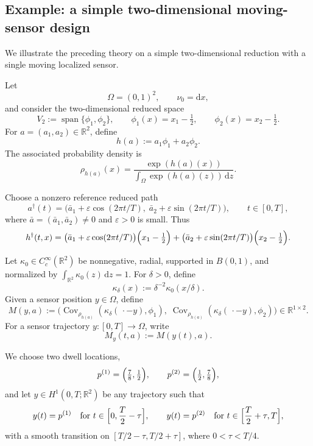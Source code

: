 \documentclass{article}
\theoremstyle{definition}
\renewcommand{\d}{\mathrm{d}}
\begin{document}
\subsection{Example: a simple two-dimensional moving-sensor design}
\label{subsec:2d-moving-sensor-example}

We illustrate the preceding theory on a simple two-dimensional reduction with a single moving
localized sensor.

Let
\[
    \Omega=(0,1)^2,
    \qquad
    \nu_0 = \d x,
\]
and consider the two-dimensional reduced space
\[
    V_2:=\operatorname{span}\{\phi_1,\phi_2\},
    \qquad
    \phi_1(x)=x_1-\tfrac12,
    \qquad
    \phi_2(x)=x_2-\tfrac12.
\]
For \(a=(a_1,a_2)\in\mathbb R^2\), define
\[
    h(a):=a_1\phi_1+a_2\phi_2.
\]
The associated probability density is
\[
    \rho_{h(a)}(x)
    =
    \frac{\exp(h(a)(x))}{\int_\Omega \exp(h(a)(z))\,\d z}.
\]

Choose a nonzero reference reduced path
\[
    a^\dagger(t)
    =
    \bigl(\bar a_1+\varepsilon \cos(2\pi t/T),\;
    \bar a_2+\varepsilon \sin(2\pi t/T)\bigr),
    \qquad t\in[0,T],
\]
where \(\bar a=(\bar a_1,\bar a_2)\neq 0\) and \(\varepsilon>0\) is small. Thus
\[
    h^\dagger(t,x)
    =
    \bigl(\bar a_1+\varepsilon \cos(2\pi t/T)\bigr)\Bigl(x_1-\tfrac12\Bigr)
    +
    \bigl(\bar a_2+\varepsilon \sin(2\pi t/T)\bigr)\Bigl(x_2-\tfrac12\Bigr).
\]

Let \(\kappa_0\in C_c^\infty(\mathbb R^2)\) be nonnegative, radial, supported in \(B(0,1)\), and
normalized by \(\int_{\mathbb R^2}\kappa_0(z)\,\d z=1\). For \(\delta>0\), define
\[
    \kappa_\delta(x):=\delta^{-2}\kappa_0(x/\delta).
\]
Given a sensor position \(y\in \Omega\), define
\[
    M(y,a)
    :=
    \bigl(
    \operatorname{Cov}_{\rho_{h(a)}}(\kappa_\delta(\,\cdot-y),\phi_1),\;
    \operatorname{Cov}_{\rho_{h(a)}}(\kappa_\delta(\,\cdot-y),\phi_2)
    \bigr)
    \in \mathbb R^{1\times 2}.
\]
For a sensor trajectory \(y:[0,T]\to\Omega\), write
\[
    M_y(t,a):=M(y(t),a).
\]

We choose two dwell locations,
\[
    p^{(1)}=\Bigl(\tfrac78,\tfrac12\Bigr),
    \qquad
    p^{(2)}=\Bigl(\tfrac12,\tfrac78\Bigr),
\]
and let \(y\in H^1(0,T;\mathbb R^2)\) be any trajectory such that
\[
    y(t)=p^{(1)}
    \quad\text{for }t\in\Bigl[0,\frac{T}{2}-\tau\Bigr],
    \qquad
    y(t)=p^{(2)}
    \quad\text{for }t\in\Bigl[\frac{T}{2}+\tau,T\Bigr],
\]
with a smooth transition on \([T/2-\tau,T/2+\tau]\), where \(0<\tau<T/4\).
\end{document}
